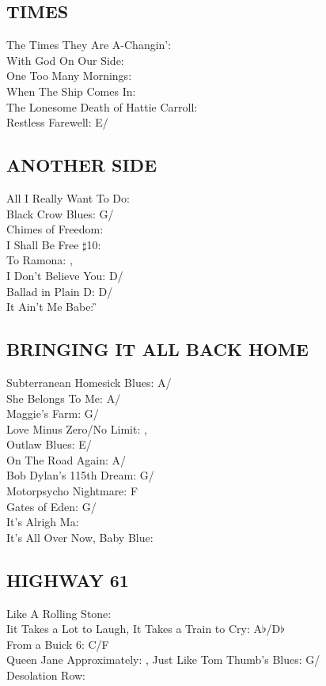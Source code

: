 \begin{articlelayout}
\subsection{TIMES}
The Times They Are A-Changin': \G\\
With God On Our Side: \C\\
One Too Many Mornings: \C\\
When The Ship Comes In: \G\\
The Lonesome Death of Hattie Carroll: \E\\
Restless Farewell: E/\A


 \subsection{ANOTHER SIDE}
All I Really Want To Do: \A\\ Black Crow Blues: G/\C\\ Chimes of Freedom: \G\\ I Shall Be Free $\sharp$10: \G\\ To Ramona: \C,\\
 I Don't Believe You: D/\G\\ Ballad in Plain D: D/\G\\ It Ain't Me Babe: \G


\subsection{BRINGING IT ALL BACK HOME}
Subterranean Homesick Blues: A/\D\\ She Belongs To Me: A/\D\\ Maggie's Farm: G/\C\\ Love Minus Zero/No Limit: \E,\\
 Outlaw Blues: E/\A\\ On The Road Again: A/\D\\ Bob Dylan's 115th Dream: G/\C\\ Motorpsycho Nightmare: F\\ Gates of Eden: G/\C\\ It's Alrigh Ma: \E\\ It's All Over Now, Baby Blue: \E


\subsection{HIGHWAY 61}
Like A Rolling Stone: \C\\ Iit Takes a Lot to Laugh, It Takes a Train to Cry: A$\flat$/D$\flat$\\
From a Buick 6: C/F\\ Queen Jane Approximately: \C,
Just Like Tom Thumb's Blues: G/\C\\ Desolation Row: \E



\end{articlelayout}
